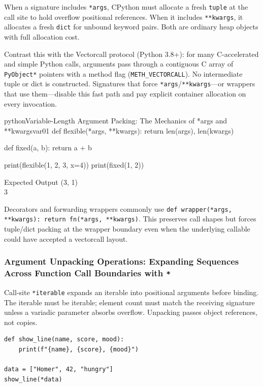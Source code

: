 \documentclass[a4paper,twoside]{report}
\begin{document}
When a signature includes \texttt{*args}, CPython must allocate a fresh \texttt{tuple} at the call site to hold overflow positional references. When it includes \texttt{**kwargs}, it allocates a fresh \texttt{dict} for unbound keyword pairs. Both are ordinary heap objects with full allocation cost.

Contrast this with the Vectorcall protocol (Python 3.8+): for many C-accelerated and simple Python calls, arguments pass through a contiguous C array of \texttt{PyObject*} pointers with a method flag (\texttt{METH\_VECTORCALL}). No intermediate tuple or dict is constructed. Signatures that force \texttt{*args}/\texttt{**kwargs}---or wrappers that use them---disable this fast path and pay explicit container allocation on every invocation.

\begin{codebox}[]{python}{Variable-Length Argument Packing: The Mechanics of *args and **kwargs}{var01}
def flexible(*args, **kwargs):
    return len(args), len(kwargs)

def fixed(a, b):
    return a + b

print(flexible(1, 2, 3, x=4))
print(fixed(1, 2))
\end{codebox}


\begin{iobox}{Expected Output}
(3, 1) \\
3 \\
\end{iobox}




Decorators and forwarding wrappers commonly use \texttt{def wrapper(*args, **kwargs): return fn(*args, **kwargs)}. This preserves call shapes but forces tuple/dict packing at the wrapper boundary even when the underlying callable could have accepted a vectorcall layout.

\subsubsection{Argument Unpacking Operations: Expanding Sequences Across Function Call Boundaries with \texttt{*}}

Call-site \texttt{*iterable} expands an iterable into positional arguments before binding. The iterable must be iterable; element count must match the receiving signature unless a variadic parameter absorbs overflow. Unpacking passes object references, not copies.

\begin{verbatim}
def show_line(name, score, mood):
    print(f"{name}, {score}, {mood}")

data = ["Homer", 42, "hungry"]
show_line(*data)
\end{verbatim}
\end{document}
